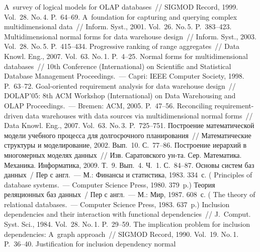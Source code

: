 \begin{multicols}{2}
{{\begin{thebibliography}{99}
   A~survey of logical models for OLAP databases~// 
SIGMOD Record, 1999. Vol.~28. No.\,4. P.~64--69.
   A~foundation for capturing 
and querying complex multidimensional data~// Inform. Syst., 2001. Vol.~26. No.\,5. 
P.~383--423.
   Multidimensional normal forms for data 
warehouse design~// Inform. Syst., 2003. Vol.~28. No.\,5. P.~415--434.
  Progressive ranking of range aggregates~// Data  
Knowl. Eng., 2007. Vol.~63. No.\,1. P.~4--25.
   Normal forms for multidimensional 
databases~// 10th Conference (International) on Scientific and Statistical Database 
Management Proceedings.~--- Capri: IEEE Computer Society, 1998. P.~63--72.
   Goal-oriented requirement analysis for 
data warehouse design~// DOLAP'05: 8th ACM Workshop (International) on Data 
Warehousing and OLAP Proceedings.~--- Bremen: ACM, 2005. P.~47--56.
   Reconciling requirement-driven 
data warehouses with data sources via multidimensional normal forms~// Data  
Knowl. Eng., 2007. Vol.~63. No.\,3. P.~725--751.
   Построение математической модели учебного 
процесса для долгосрочного планирования~// Математические структуры и 
моделирование, 2002. Вып.~10. С.~77--86.
   Построение иерархий в многомерных моделях данных~// 
Изв. Саратовского ун-та. Сер. Математика. Механика. 
Информатика, 2009. Т.~9. Вып.~4. Ч.~1. С.~84--87.
   Основы систем баз данных~/ Пер с англ.~--- М.: Финансы и статистика, 
1983. 334~с. ( Principles of database systems.~---
 Computer Science Press, 1980. 379~p.)
   Теория реляционных баз данных~/ Пер с англ.~--- М.: Мир, 1987. 608~с.
  ( The theory of relational databases.~--- Computer Science Press,
  1983. 637~p.)
   Inclusion dependencies and their 
interaction with functional dependencies~// J.~Comput. Syst. Sci., 1984. Vol.~28. 
No.\,1. P.~29--59.
   The implication problem for inclusion dependencies: 
A~graph approach~// SIGMOD Record, 1990. Vol.~19. No.\,1. P.~36--40.
   Justification for inclusion dependency normal 

\end{thebibliography}}}
\end{multicols}
